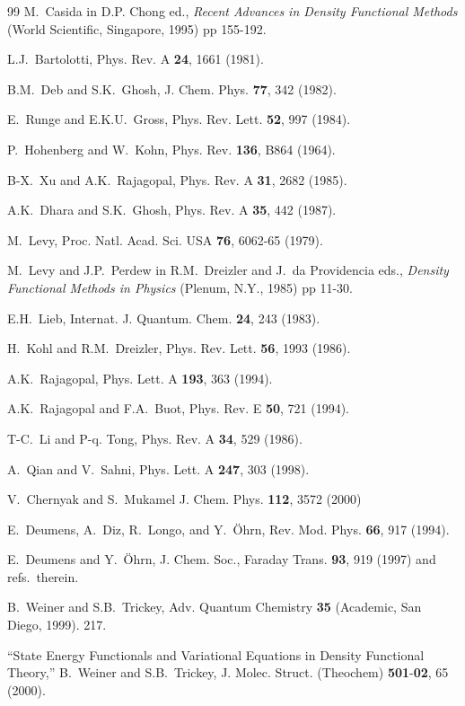 \documentclass[aps,preprint]{revtex4}%
\begin{document}
\begin{thebibliography}{99}
M.~Casida in D.P. Chong ed., \textit{Recent Advances in
Density Functional Methods} (World Scientific, Singapore, 1995) pp 155-192.

L.J.~Bartolotti, Phys. Rev. A \textbf{24}, 1661 (1981).

B.M.~Deb and S.K.~Ghosh, J. Chem. Phys. \textbf{77}, 342 (1982).

E.~Runge and E.K.U.~Gross, Phys. Rev. Lett. \textbf{52}, 997 (1984).

P.~Hohenberg and W.~Kohn, Phys. Rev. \textbf{136}, B864 (1964).

B-X.~Xu and A.K.~Rajagopal, Phys. Rev. A \textbf{31}, 2682 (1985).

A.K.~Dhara and S.K.~Ghosh, Phys. Rev. A \textbf{35}, 442 (1987).

M.~Levy, Proc. Natl. Acad. Sci. USA \textbf{76}, 6062-65 (1979).

M.~Levy and J.P.~Perdew in R.M.~Dreizler and J.~da
Providencia eds., \textit{Density Functional Methods in Physics} (Plenum,
N.Y., 1985) pp 11-30.

E.H.~Lieb, Internat. J. Quantum. Chem. \textbf{24}, 243 (1983).

H.~Kohl and R.M.~Dreizler, Phys. Rev. Lett. \textbf{56}, 1993 (1986).

A.K.~Rajagopal, Phys. Lett. A \textbf{193}, 363 (1994).

A.K.~Rajagopal and F.A.~Buot, Phys. Rev. E \textbf{50},
721 (1994).

T-C.~Li and P-q. Tong, Phys. Rev. A \textbf{34}, 529 (1986).

A.~Qian and V.~Sahni, Phys. Lett. A \textbf{247}, 303 (1998).

V.~Chernyak and S.~Mukamel J. Chem. Phys. \textbf{112},
3572 (2000)

E.~Deumens, A.~Diz, R.~Longo, and Y.~{\"O}hrn, Rev. Mod.
Phys. \textbf{66}, 917 (1994).

E.~Deumens and Y.~{\"O}hrn, J. Chem. Soc., Faraday Trans.
\textbf{93}, 919 (1997) and refs.~therein.

B.~Weiner and S.B.~Trickey, Adv. Quantum Chemistry
\textbf{35} (Academic, San Diego, 1999). 217.

``State Energy Functionals and Variational Equations in
Density Functional Theory,'' B.~Weiner and S.B.~Trickey, J. Molec. Struct.
(Theochem) \textbf{501}-\textbf{02}, 65 (2000).


\end{thebibliography}
\end{document}
